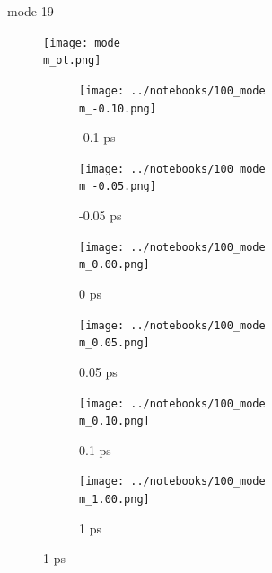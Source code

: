 \documentclass{beamer}
\begin{document}
\renewcommand\m{19}
\begin{frame}{mode \m}
					\vspace{\vh mm}
	\begin{figure}
		\centering
		\texttt{[image: mode\\m\_ot.png]}
	\end{figure}
	\begin{figure}
		\centering
		\begin{subfigure}[b]{\w\textwidth}
			\centering
			\texttt{[image: ../notebooks/100\_mode\\m\_-0.10.png]}
			\caption{-0.1 ps}
		\end{subfigure}
		\begin{subfigure}[b]{\w\textwidth}
			\centering
			\texttt{[image: ../notebooks/100\_mode\\m\_-0.05.png]}
			\caption{-0.05 ps}
		\end{subfigure}
		\begin{subfigure}[b]{\w\textwidth}
			\centering
			\texttt{[image: ../notebooks/100\_mode\\m\_0.00.png]}
			\caption{0 ps}
		\end{subfigure}
		\begin{subfigure}[b]{\w\textwidth}
			\centering
			\texttt{[image: ../notebooks/100\_mode\\m\_0.05.png]}
			\caption{0.05 ps}
		\end{subfigure}
		\begin{subfigure}[b]{\w\textwidth}
			\centering
			\texttt{[image: ../notebooks/100\_mode\\m\_0.10.png]}
			\caption{0.1 ps}
		\end{subfigure}
		\begin{subfigure}[b]{\w\textwidth}
			\centering
			\texttt{[image: ../notebooks/100\_mode\\m\_1.00.png]}
			\caption{1 ps}
		\end{subfigure}
	\end{figure}
\end{frame}
\end{document}
